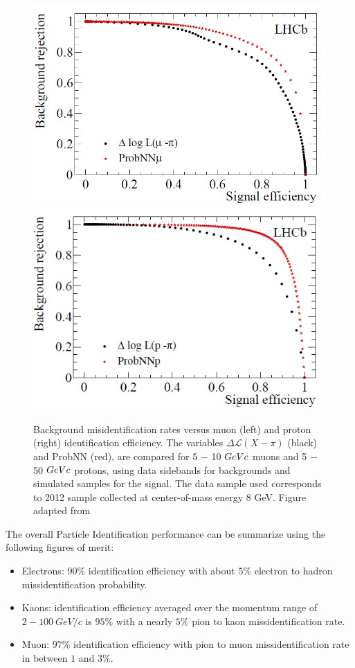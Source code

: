 \begin{figure}[h]
 \begin{center}
  \includegraphics[width=0.49\linewidth]{figures/PID_prob_left.PNG}
   \includegraphics[width=0.49\linewidth]{figures/PID_prob_right.PNG}
    \caption{Background misidentification rates versus muon (left) and proton (right)
identification efficiency. The variables $\Delta \mathcal{L} (X −\pi)$
(black) and ProbNN (red), are compared for 5 − 10 $GeV \/c$ muons and 5 − 50 $GeV \/c$ protons,
using data sidebands for backgrounds and simulated samples for the signal. The data sample
used corresponds to 2012 sample collected at center-of-mass energy 8 GeV. Figure adapted from~\cite{PID}}%
\label{fig:PID baseline}%
 \end{center}
\end{figure}

The overall Particle Identification performance can be summarize using the following figures of merit:

\begin{itemize}
    \item Electrons: $90\%$ identification efficiency with about $5\%$ electron to hadron missidentification probability. 
    \item Kaons: identification efficiency averaged over the momentum range of\\ $2-100~ GeV/c$ is $95\%$ with a nearly $5\%$ pion to kaon missidentification rate. 
    \item Muon: $97\%$ identification efficiency with pion to muon missidentification rate in between $1$ and $3\%$.  
\end{itemize}


